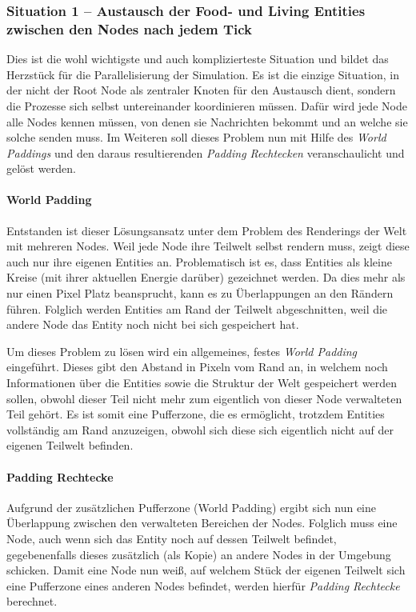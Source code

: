 \documentclass[course=erap]{aspdoc}
\begin{document}
\subsubsection{Situation 1 -- Austausch der Food- und Living Entities zwischen den Nodes nach jedem Tick}
Dies ist die wohl wichtigste und auch komplizierteste Situation und bildet das Herzstück für die Parallelisierung der Simulation. Es ist die einzige Situation, in der nicht der Root Node als zentraler Knoten für den Austausch dient, sondern die Prozesse sich selbst untereinander koordinieren müssen. Dafür wird jede Node alle Nodes kennen müssen, von denen sie Nachrichten bekommt und an welche sie solche senden muss. Im Weiteren soll dieses Problem nun mit Hilfe des \emph{World Paddings} und den daraus resultierenden \emph{Padding Rechtecken} veranschaulicht und gelöst werden.


\paragraph{World Padding}
Entstanden ist dieser Lösungsansatz unter dem Problem des Renderings der Welt mit mehreren Nodes. Weil jede Node ihre Teilwelt selbst rendern muss, zeigt diese auch nur ihre eigenen Entities an. Problematisch ist es, dass Entities als kleine Kreise (mit ihrer aktuellen Energie darüber) gezeichnet werden. Da dies mehr als nur einen Pixel Platz beansprucht, kann es zu Überlappungen an den Rändern führen. Folglich werden Entities am Rand der Teilwelt abgeschnitten, weil die andere Node das Entity noch nicht bei sich gespeichert hat.

Um dieses Problem zu lösen wird ein allgemeines, festes \emph{World Padding} eingeführt. Dieses gibt den Abstand in Pixeln vom Rand an, in welchem noch Informationen über die Entities sowie die Struktur der Welt gespeichert werden sollen, obwohl dieser Teil nicht mehr zum eigentlich von dieser Node verwalteten Teil gehört. Es ist somit eine Pufferzone, die es ermöglicht, trotzdem Entities vollständig am Rand anzuzeigen, obwohl sich diese sich eigentlich nicht auf der eigenen Teilwelt befinden.


\paragraph{Padding Rechtecke}
Aufgrund der zusätzlichen Pufferzone (World Padding) ergibt sich nun eine Überlappung zwischen den verwalteten Bereichen der Nodes. Folglich muss eine Node, auch wenn sich das Entity noch auf dessen Teilwelt befindet, gegebenenfalls dieses zusätzlich (als Kopie) an andere Nodes in der Umgebung schicken. Damit eine Node nun weiß, auf welchem Stück der eigenen Teilwelt sich eine Pufferzone eines anderen Nodes befindet, werden hierfür \emph{Padding Rechtecke} berechnet.
\end{document}
